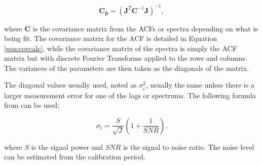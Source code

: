 \begin{equation}
\label{eqn:jacinv}
\mathbf{C}_{\mathbf{\hat{p}}}=(\mathbf{J}^T \mathbf{C}^{-1}\mathbf{J})^{-1},
\end{equation}

\noindent where $ \mathbf{C}$ is the covariance matrix from the ACFs or spectra depending on what is being fit. The covariance matrix for the ACF is detailed in Equation \ref{eqn:covcalc}, while the covariance matrix of the spectra is simply the ACF matrix but with discrete Fourier Transforms applied to the rows and columns. The variances of the parameters are then taken as the diagonals of the matrix.


%
%



The diagonal values usually used, noted as $\sigma_i^2$, usually the same unless there is a larger measurement error for one of the lags or spectrums.  The following formula from  \cite{nicollsisrschool2013} can be used:

\begin{equation}
\label{sigpow}
\sigma_i = \frac{S}{\sqrt{J}}\left(1+\frac{1}{SNR}\right).
\end{equation}

\noindent where $S$ is the signal power and $SNR$ is the signal to noise ratio. The noise level can be estimated from the calibration period. 

